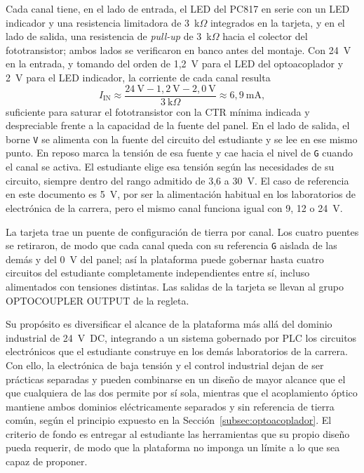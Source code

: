 \documentclass[12pt,a4paper,oneside]{report}
\begin{document}
Cada canal tiene, en el lado de entrada, el LED del PC817 en serie con un LED indicador y una resistencia limitadora de 3~k$\Omega$ integrados en la tarjeta, y en el lado de salida, una resistencia de \emph{pull-up} de 3~k$\Omega$ hacia el colector del fototransistor; ambos lados se verificaron en banco antes del montaje. Con 24~V en la entrada, y tomando del orden de 1,2~V para el LED del optoacoplador y 2~V para el LED indicador, la corriente de cada canal resulta
\begin{equation}
    I_{\mathrm{IN}} \approx \frac{24~\mathrm{V} - 1{,}2~\mathrm{V} - 2{,}0~\mathrm{V}}{3~\mathrm{k}\Omega} \approx 6{,}9~\mathrm{mA},
    \label{eq:pc817_corriente}
\end{equation}
suficiente para saturar el fototransistor con la CTR mínima indicada y despreciable frente a la capacidad de la fuente del panel. En el lado de salida, el borne \texttt{V} se alimenta con la fuente del circuito del estudiante y se lee en ese mismo punto. En reposo marca la tensión de esa fuente y cae hacia el nivel de \texttt{G} cuando el canal se activa. El estudiante elige esa tensión según las necesidades de su circuito, siempre dentro del rango admitido de 3,6 a 30~V. El caso de referencia en este documento es 5~V, por ser la alimentación habitual en los laboratorios de electrónica de la carrera, pero el mismo canal funciona igual con 9, 12 o 24~V.

La tarjeta trae un puente de configuración de tierra por canal. Los cuatro puentes se retiraron, de modo que cada canal queda con su referencia \texttt{G} aislada de las demás y del 0~V del panel; así la plataforma puede gobernar hasta cuatro circuitos del estudiante completamente independientes entre sí, incluso alimentados con tensiones distintas. Las salidas de la tarjeta se llevan al grupo OPTOCOUPLER OUTPUT de la regleta.

Su propósito es diversificar el alcance de la plataforma más allá del dominio industrial de 24~V~DC, integrando a un sistema gobernado por PLC los circuitos electrónicos que el estudiante construye en los demás laboratorios de la carrera. Con ello, la electrónica de baja tensión y el control industrial dejan de ser prácticas separadas y pueden combinarse en un diseño de mayor alcance que el que cualquiera de las dos permite por sí sola, mientras que el acoplamiento óptico mantiene ambos dominios eléctricamente separados y sin referencia de tierra común, según el principio expuesto en la Sección~\ref{subsec:optoacoplador}. El criterio de fondo es entregar al estudiante las herramientas que su propio diseño pueda requerir, de modo que la plataforma no imponga un límite a lo que sea capaz de proponer.
\end{document}

